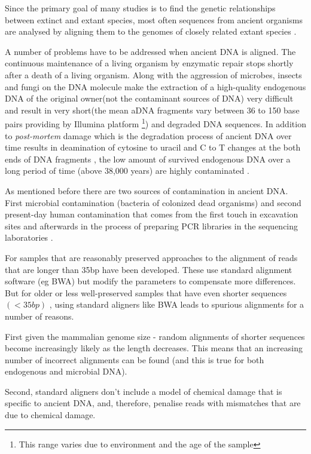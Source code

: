\documentclass[11pt,a4paper]{report}
\begin{document}
Since the primary goal of many studies is to find the genetic 
relationships between extinct and extant species, 
most often sequences from ancient organisms are analysed by 
aligning them to the genomes of closely related extant species
\cite{Neanthertal}\cite{AncientDNA}.

A number of problems have to be addressed when ancient DNA is aligned.
The continuous maintenance of a living organism by enzymatic repair stops shortly 
after a death of a living organism. Along with the aggression of microbes,
insects and fungi on the DNA molecule make the extraction of a high-quality 
endogenous DNA of the original owner(not the contaminant sources of DNA) 
very difficult and result in very short(the mean aDNA fragments vary between 
36 to 150 base pairs providing by Illumina platform\cite{rizzi2012ancient} 
\footnote{This range varies due to environment and the age of the sample})
 and degraded DNA sequences\cite{paabo2004genetic}.
In addition to \emph{post-mortem} damage which is the degradation process of
ancient DNA over time results in deamination of cytosine to uracil and C to T 
changes at the both ends of DNA fragments \cite{futureofaDNA}, the low amount 
of survived endogenous DNA over a long period of time (above 38,000 years) 
are highly contaminated \cite{paabo2004genetic}\cite{aDNA}.

As mentioned before there are two sources of contamination in ancient DNA.
First microbial contamination (bacteria of colonized dead organisms) and second present-day human contamination that comes from the first touch in excavation sites and afterwards in the process of preparing PCR libraries in the sequencing laboratories \cite{AncientDNA}.

For samples that are reasonably preserved approaches to the alignment of reads that are longer than 35bp have been developed. 
These use standard alignment software (eg BWA) but modify the parameters to compensate more differences.
But for older or less well-preserved samples that have even shorter sequences $(<35 bp)$ \cite{meyer2014mitochondrial},
using standard aligners like BWA leads to spurious alignments for a number of reasons.

First given the mammalian genome size - random alignments of shorter sequences become increasingly likely as the length decreases. This means that an increasing number of incorrect alignments can be found (and this is true for both endogenous and microbial DNA).

Second, standard aligners don't include a model of chemical damage that is specific to ancient DNA, and, therefore, penalise reads with mismatches that are due to chemical damage.
\end{document}

